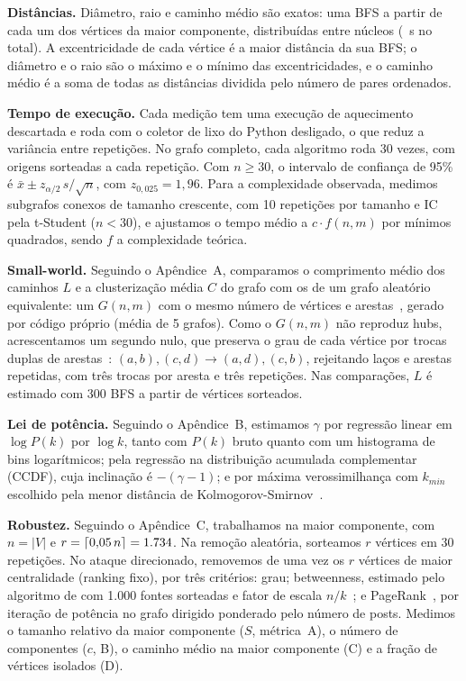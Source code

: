 \IfFileExists{webmedia.cls}{\webmediatrue\documentclass[sigconf]{webmedia}}{\documentclass[sigconf]{acmart}}
\begin{document}
\textbf{Distâncias.} Diâmetro, raio e caminho médio são exatos: uma BFS a partir de cada um dos
\nLCC{} vértices da maior componente, distribuídas entre \nucleos{} núcleos (\tDist~s no total). A
excentricidade de cada vértice é a maior distância da sua BFS; o diâmetro e o raio são o máximo e o
mínimo das excentricidades, e o caminho médio é a soma de todas as distâncias dividida pelo número de
pares ordenados.

\textbf{Tempo de execução.} Cada medição tem uma execução de aquecimento descartada e roda com o
coletor de lixo do Python desligado, o que reduz a variância entre repetições. No grafo completo, cada
algoritmo roda 30 vezes, com origens sorteadas a cada repetição. Com $n \geq 30$, o intervalo de
confiança de 95\% é $\bar{x} \pm z_{\alpha/2}\,s/\sqrt{n}$, com $z_{0{,}025} = 1{,}96$. Para a
complexidade observada, medimos subgrafos conexos de tamanho crescente, com 10 repetições por tamanho
e IC pela t-Student ($n < 30$), e ajustamos o tempo médio a $c \cdot f(n,m)$ por mínimos quadrados,
sendo $f$ a complexidade teórica.

\textbf{Small-world.} Seguindo o Apêndice~A, comparamos o comprimento médio dos caminhos $L$ e a
clusterização média $C$ do grafo com os de um grafo aleatório equivalente: um $G(n,m)$ com o mesmo
número de vértices e arestas~\cite{erdos1959}, gerado por código próprio (média de 5 grafos). Como o
$G(n,m)$ não reproduz hubs, acrescentamos um segundo nulo, que preserva o grau de cada vértice por
trocas duplas de arestas~\cite{maslov2002}: $(a,b),(c,d) \rightarrow (a,d),(c,b)$, rejeitando laços e
arestas repetidas, com três trocas por aresta e três repetições. Nas comparações, $L$ é estimado com
300 BFS a partir de vértices sorteados.

\textbf{Lei de potência.} Seguindo o Apêndice~B, estimamos $\gamma$ por regressão linear em
$\log P(k)$ por $\log k$, tanto com $P(k)$ bruto quanto com um histograma de bins logarítmicos; pela
regressão na distribuição acumulada complementar (CCDF), cuja inclinação é $-(\gamma - 1)$; e por
máxima verossimilhança com $k_{min}$ escolhido pela menor distância de Kolmogorov-Smirnov~\cite{clauset2009}.

\textbf{Robustez.} Seguindo o Apêndice~C, trabalhamos na maior componente, com $n = |V|$ e
$r = \lceil 0{,}05\,n \rceil = 1.734$. Na remoção aleatória, sorteamos $r$ vértices em 30
repetições. No ataque direcionado, removemos de uma vez os $r$ vértices de maior centralidade (ranking
fixo), por três critérios: grau; betweenness, estimado pelo algoritmo de \citet{brandes2001} com 1.000
fontes sorteadas e fator de escala $n/k$~\cite{brandes2007}; e PageRank~\cite{page1999}, por iteração
de potência no grafo dirigido ponderado pelo número de posts. Medimos o tamanho relativo da maior
componente ($S$, métrica~A), o número de componentes ($c$, B), o caminho médio na maior componente
(C) e a fração de vértices isolados (D).
\end{document}
